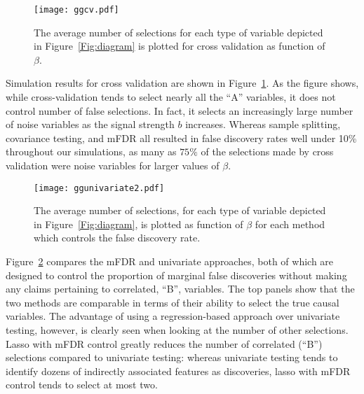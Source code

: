 
\begin{figure} [!htb]
 \centering
  \texttt{[image: ggcv.pdf]}
  \caption{\label{Fig:cv} The average number of selections for each type of variable depicted in Figure~\ref{Fig:diagram} is plotted for cross validation as function of $\beta$.}
\end{figure}


Simulation results for cross validation are shown in Figure~\ref{Fig:cv}.  As the figure shows, while cross-validation tends to select nearly all the ``A'' variables, it does not control number of false selections.  In fact, it selects an increasingly large number of noise variables as the signal strength $b$ increases. Whereas sample splitting, covariance testing, and mFDR all resulted in false discovery rates well under 10\% throughout our simulations, as many as $75\%$ of the selections made by cross validation were noise variables for larger values of $\beta$.


\begin{figure} [!htb]
 \centering
  \texttt{[image: ggunivariate2.pdf]}
  \caption{\label{Fig:univariate} The average number of selections, for each type of variable depicted in Figure~\ref{Fig:diagram}, is plotted as function of $\beta$ for each method which controls the false discovery rate.}
\end{figure}

Figure~\ref{Fig:univariate} compares the mFDR and univariate approaches, both of which are designed to control the proportion of marginal false discoveries without making any claims pertaining to correlated, ``B'', variables. The top panels show that the two methods are comparable in terms of their ability to select the true causal variables.  The advantage of using a regression-based approach over univariate testing, however, is clearly seen when looking at the number of other selections.  Lasso with mFDR control greatly reduces the number of correlated (``B'') selections compared to univariate testing: whereas univariate testing tends to identify dozens of indirectly associated features as discoveries, lasso with mFDR control tends to select at most two.

